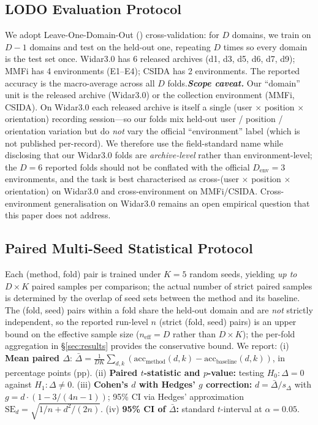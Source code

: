 \documentclass[journal,11pt]{IEEEtran}
\newcommand{\LODO}{\text{LODO}}
\begin{document}
\subsection{LODO Evaluation Protocol}
We adopt Leave-One-Domain-Out (\LODO) cross-validation: for $D$ domains, we train on $D-1$ domains and test on the held-out one, repeating $D$ times so every domain is the test set once. Widar3.0 has 6 released archives (d1, d3, d5, d6, d7, d9); MMFi has 4 environments (E1--E4); CSIDA has 2 environments. The reported accuracy is the macro-average across all $D$ folds.\textbf{\emph{Scope caveat.}} Our ``domain'' unit is the released archive (Widar3.0) or the collection environment (MMFi, CSIDA). On Widar3.0 each released archive is itself a single (user $\times$ position $\times$ orientation) recording session---so our \LODO{} folds mix held-out user / position / orientation variation but do \emph{not} vary the official ``environment'' label (which is not published per-record). We therefore use the field-standard name \LODO{} while disclosing that our Widar3.0 folds are \emph{archive-level} rather than environment-level; the $D = 6$ reported folds should not be conflated with the official $D_{\text{env}} = 3$ environments, and the task is best characterised as cross-(user $\times$ position $\times$ orientation) on Widar3.0 and cross-environment on MMFi/CSIDA. Cross-environment generalisation on Widar3.0 remains an open empirical question that this paper does not address.

\subsection{Paired Multi-Seed Statistical Protocol}
Each (method, fold) pair is trained under $K = 5$ random seeds, yielding \emph{up to} $D \times K$ paired samples per comparison; the actual number of strict paired samples is determined by the overlap of seed sets between the method and its baseline. The (fold, seed) pairs within a fold share the held-out domain and are \emph{not} strictly independent, so the reported run-level $n$ (strict (fold, seed) pairs) is an upper bound on the effective sample size ($n_\text{eff} = D$ rather than $D \times K$); the per-fold aggregation in \S\ref{sec:results} provides the conservative bound. We report: (i) \textbf{Mean paired $\Delta$}: $\bar{\Delta} = \frac{1}{DK} \sum_{d,k} (\text{acc}_{\text{method}}(d,k) - \text{acc}_{\text{baseline}}(d,k))$, in percentage points (pp). (ii) \textbf{Paired $t$-statistic and $p$-value:} testing $H_0: \Delta = 0$ against $H_1: \Delta \neq 0$. (iii) \textbf{Cohen's $d$ with Hedges' $g$ correction:} $d = \bar{\Delta} / s_{\Delta}$ with $g = d \cdot (1 - 3/(4n - 1))$; 95\% CI via Hedges' approximation $\text{SE}_d = \sqrt{1/n + d^2 / (2n)}$. (iv) \textbf{95\% CI of $\bar{\Delta}$:} standard $t$-interval at $\alpha = 0.05$.
\end{document}

